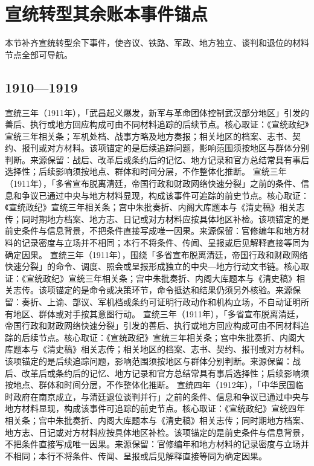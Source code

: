 \section{宣统转型其余账本事件锚点}
本节补齐宣统转型余下事件，使咨议、铁路、军政、地方独立、谈判和退位的材料节点全部可导航。
\subsection{1910—1919}
宣统三年（1911年），「武昌起义爆发，新军与革命团体控制武汉部分地区」引发的善后、执行或地方回应构成可由不同材料追踪的后续节点。核心取证：《宣统政纪》宣统三年相关条；军机处档、战事方略及地方奏报；相关地区的档案、志书、契约、报刊或对方材料。该项锚定的是后续追踪问题，影响范围须按地区与群体分别判断。来源保留：战后、改革后或条约后的记忆、地方记录和官方总结常具有事后选择性；后续影响须按地点、群体和时间分层，不作整体化推断。
宣统三年（1911年），「多省宣布脱离清廷，帝国行政和财政网络快速分裂」之前的条件、信息和争议已通过中央与地方材料显现，构成该事件可追踪的前史节点。核心取证：《宣统政纪》宣统三年相关条；宫中朱批奏折、内阁大库题本与《清史稿》相关志传；同时期地方档案、地方志、日记或对方材料应按具体地区补检。该项锚定的是前史条件与信息背景，不把条件直接写成唯一因果。来源保留：官修编年和地方材料的记录密度与立场并不相同；本行不将条件、传闻、呈报或后见解释直接等同为确定因果。
宣统三年（1911年），围绕「多省宣布脱离清廷，帝国行政和财政网络快速分裂」的命令、调度、照会或呈报形成独立的中央—地方行动文书链。核心取证：《宣统政纪》宣统三年相关条；宫中朱批奏折、内阁大库题本与《清史稿》相关志传。该项锚定的是命令或决策环节，命令抵达和结果仍须另外核验。来源保留：奏折、上谕、部议、军机档或条约可证明行政动作和机构立场，不自动证明所有地区、群体或对手按其意图行动。
宣统三年（1911年），「多省宣布脱离清廷，帝国行政和财政网络快速分裂」引发的善后、执行或地方回应构成可由不同材料追踪的后续节点。核心取证：《宣统政纪》宣统三年相关条；宫中朱批奏折、内阁大库题本与《清史稿》相关志传；相关地区的档案、志书、契约、报刊或对方材料。该项锚定的是后续追踪问题，影响范围须按地区与群体分别判断。来源保留：战后、改革后或条约后的记忆、地方记录和官方总结常具有事后选择性；后续影响须按地点、群体和时间分层，不作整体化推断。
宣统四年（1912年），「中华民国临时政府在南京成立，与清廷退位谈判并行」之前的条件、信息和争议已通过中央与地方材料显现，构成该事件可追踪的前史节点。核心取证：《宣统政纪》宣统四年相关条；宫中朱批奏折、内阁大库题本与《清史稿》相关志传；同时期地方档案、地方志、日记或对方材料应按具体地区补检。该项锚定的是前史条件与信息背景，不把条件直接写成唯一因果。来源保留：官修编年和地方材料的记录密度与立场并不相同；本行不将条件、传闻、呈报或后见解释直接等同为确定因果。
